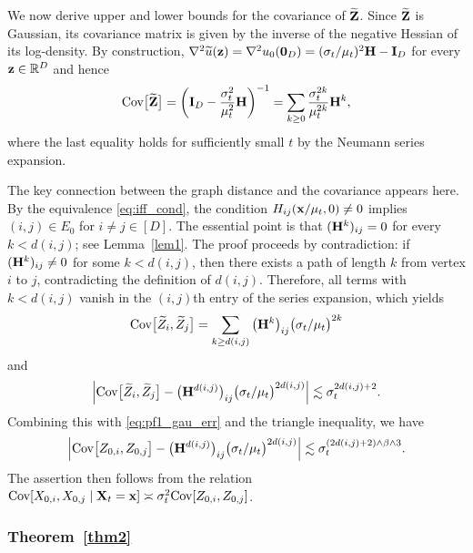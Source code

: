 \documentclass[11pt,a4paper,final]{article}
\numberwithin{equation}{section}
\theoremstyle{remark}
\newcommand{\bH}{{\bf H}}
\newcommand{\bI}{{\bf I}}
\newcommand{\bx}{{\bf x}}
\newcommand{\bX}{{\bf X}}
\newcommand{\bz}{{\bf z}}
\newcommand{\bZ}{{\bf Z}}
\newcommand{\bbR}{{\mathbb R}}
\newcommand{\Cov}{\mbox{{\rm Cov}}}
\newcommand{\bean}{\setlength\arraycolsep{1pt}\begin{eqnarray*}}
\newcommand{\eean}{\end{eqnarray*}}
\begin{document}
We now derive upper and lower bounds for the covariance of $\widetilde \bZ$.
Since $\widetilde \bZ$ is Gaussian, its covariance matrix is given by the inverse of the negative Hessian of its log-density.
By construction, $\nabla^2 \widetilde u(\bz) = \nabla^2 u_{0}(\mathbf{0}_{D}) = (\sigma_{t}/\mu_{t})^2 \bH - \bI_{D}$ for every $\bz \in \bbR^{D}$ and hence
\bean
\Cov\big[ \widetilde \bZ \big]
=  \bigg( \bI_{D} - \frac{\sigma_{t}^2}{\mu_{t}^2} \bH \bigg)^{-1}
= \sum_{k \geq 0} \frac{\sigma_{t}^{2k}}{\mu_{t}^{2k}} \bH^{k},
\eean
where the last equality holds for sufficiently small $t$ by the Neumann series expansion.

The key connection between the graph distance and the covariance appears here.
By the equivalence \eqref{eq:iff_cond}, the condition
$H_{ij}(\bx / \mu_{t},0) \neq 0$ implies $(i,j) \in E_{0}$ for $i \neq j \in [D]$.
The essential point is that $(\bH^{k})_{ij} = 0$ for every $k < d(i,j)$; see Lemma~\ref{lem1}.
The proof proceeds by contradiction: if $(\bH^{k})_{ij} \neq 0$ for some $k < d(i,j)$, then there exists a path of length $k$ from vertex $i$ to $j$, contradicting the definition of $d(i,j)$.
Therefore, all terms with $k < d(i,j)$ vanish in the $(i,j)$th entry of the series expansion, which yields
\bean
\Cov\big[ \widetilde Z_{i}, \widetilde Z_{j} \big]
= \sum_{k \geq d(i,j)} \big( \bH^{k} \big)_{ij} \big( \sigma_{t}/ \mu_{t} \big)^{2k}
\eean
and
\bean
\Big\vert {\rm Cov} \big[ \widetilde Z_{i}, \widetilde Z_{j} \big] - \big( \bH^{d(i,j)} \big)_{ij} \big( \sigma_{t} / \mu_{t} \big)^{2d(i,j)}
\Big\vert \lesssim \sigma_{t}^{2d(i,j)+2}.
\eean
Combining this with \eqref{eq:pf1_gau_err} and the triangle inequality, we have
\bean
\Big\vert {\rm Cov} \big[ Z_{0,i}, Z_{0,j} \big] - \big( \bH^{d(i,j)} \big)_{ij} \big( \sigma_{t}/\mu_{t} \big)^{2d(i,j)}
\Big\vert \lesssim \sigma_{t}^{(2d(i,j)+2)\wedge \beta \wedge 3}.
\eean
The assertion then follows from the relation $\Cov[X_{0,i}, X_{0,j} \mid \bX_{t} = \bx] \asymp \sigma_{t}^2 \Cov[Z_{0,i}, Z_{0,j}]$.

\subsubsection{Theorem~\ref{thm2}}
\end{document}
